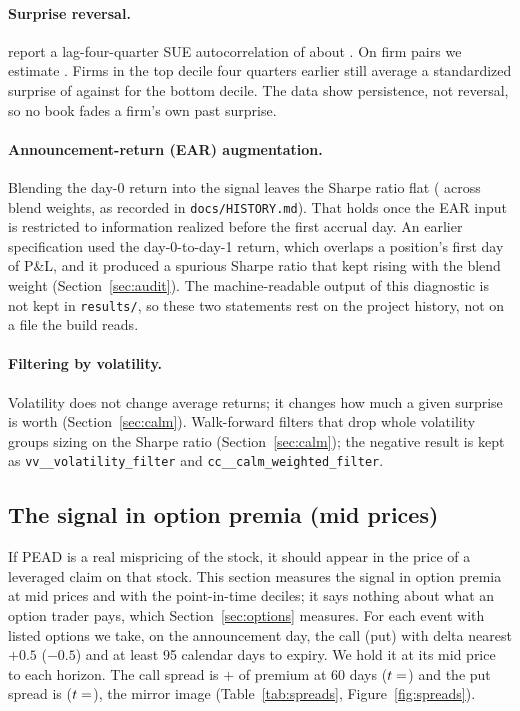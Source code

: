 \documentclass[11pt]{article}
\makeatletter
\theoremstyle{definition}
\newcommand{\1}{\mathbf{1}}
\newcommand{\sn}[1]{\texttt{\sn@scan#1\@nil}}
\def\sn@scan#1{\ifx#1\@nil\else\ifx#1_\_\allowbreak\else#1\fi\expandafter\sn@scan\fi}
\makeatother
\begin{document}
\paragraph{Surprise reversal.} \citet{BernardThomas1990} report a lag-four-quarter SUE
autocorrelation of about . On  firm pairs we estimate . Firms in the
top decile four quarters earlier still average a standardized surprise of  against  for the
bottom decile. The data show persistence, not reversal, so no book fades a firm's own past surprise.

\paragraph{Announcement-return (EAR) augmentation.} Blending the day-0 return into the signal leaves
the Sharpe ratio flat ( across blend weights, as recorded in \texttt{docs/HISTORY.md}).
That holds once the EAR input is restricted to information realized before the first accrual day. An
earlier specification used the day-0-to-day-1 return, which overlaps a position's first day of P\&L,
and it produced a spurious Sharpe ratio that kept rising with the blend weight (Section~\ref{sec:audit}).
The machine-readable output of this diagnostic is not kept in \texttt{results/}, so these two statements rest on the
project history, not on a file the build reads.

\paragraph{Filtering by volatility.} Volatility does not change average returns; it changes how much
a given surprise is worth (Section~\ref{sec:calm}). Walk-forward filters that drop whole volatility groups  sizing on the Sharpe ratio
(Section~\ref{sec:calm}); the negative result is kept as \sn{volatility_filter} and
\sn{calm_weighted_filter}.

\subsection{The signal in option premia (mid prices)}

If PEAD is a real mispricing of the stock, it should appear in the price of a leveraged claim on that
stock. This section measures the signal in option premia at mid prices and with the point-in-time deciles; it says nothing about what an option trader pays, which Section~\ref{sec:options} measures. For each event with listed options we take, on the announcement day, the call (put) with delta
nearest $+0.5$ ($-0.5$) and at least 95 calendar days to expiry. We hold it at its mid price to each
horizon. The call spread is $+$ of premium at 60 days ($t=\stv{call60.t}$) and the put
spread is  ($t=\stv{put60.t}$), the mirror image (Table~\ref{tab:spreads},
Figure~\ref{fig:spreads}).
\end{document}
